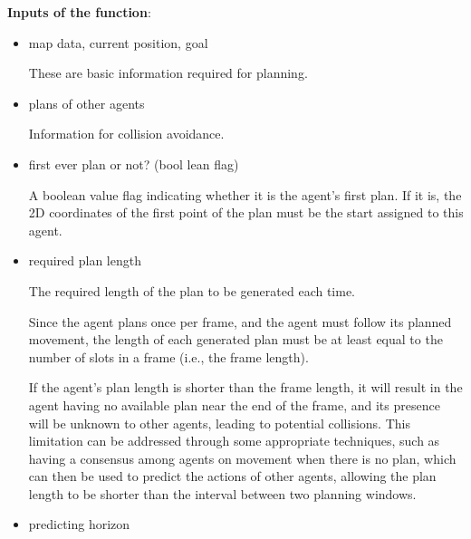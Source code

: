 \textbf{Inputs of the function}:
\begin{itemize}
    \item map data, current position, goal
    
    These are basic information required for planning. 

    \item plans of other agents
    
    Information for collision avoidance.

    \item first ever plan or not? (bool lean flag)
    
    A boolean value flag indicating whether it is the agent's first plan. If it is, the 2D coordinates of the first point of the plan must be the start assigned to this agent.
    
    \item required plan length
    
    The required length of the plan to be generated each time.

    Since the agent plans once per frame, and the agent must follow its planned movement, the length of each generated plan must be at least equal to the number of slots in a frame (i.e., the frame length).

    If the agent's plan length is shorter than the frame length, it will result in the agent having no available plan near the end of the frame, and its presence will be unknown to other agents, leading to potential collisions.
    This limitation can be addressed through some appropriate techniques, such as having a consensus among agents on movement when there is no plan, which can then be used to predict the actions of other agents, allowing the plan length to be shorter than the interval between two planning windows.
    \item predicting horizon
    

\end{itemize}
